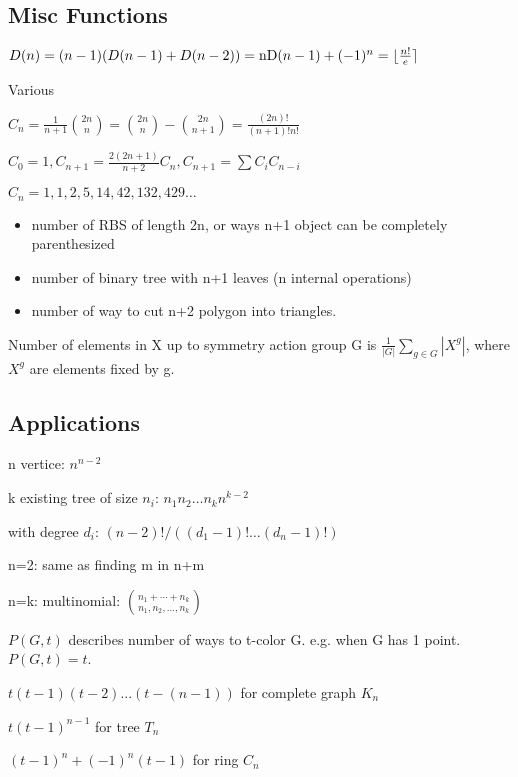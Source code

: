 \subsection{Misc Functions}

$D (n) = (n - 1) (D (n - 1) + D (n - 2)) = \operatorname{nD}
(n - 1) + (- 1)^n = \lfloor \frac{n!}{e} \rceil$

Various
\begin{tmindent}
  $C_n = \frac{1}{n + 1} \binom{2 n}{n} = \binom{2 n}{n} - \binom{2 n}{n + 1}
  = \frac{(2 n) !}{(n + 1) !n!}$
  
  $C_0 = 1, C_{n + 1} = \frac{2 (2 n + 1)}{n + 2} C_n, C_{n + 1} = \sum C_i
  C_{n - i}$
  
  $C_n = 1, 1, 2, 5, 14, 42, 132, 429 \ldots$
  
  \begin{itemize}
    \item number of RBS of length 2n, or ways n+1 object can be completely
    parenthesized
    
    \item number of  binary tree with n+1 leaves (n internal
    operations)
    
    \item number of way to cut n+2 polygon into triangles.
  \end{itemize}
\end{tmindent}
 Number of elements in X up to symmetry action
group G is $\frac{1}{| G |} \sum_{g \in G} | X^g |$, where $X^g$ are elements
fixed by g.

\subsection{Applications}

\begin{tmindent}
  n vertice: $n^{n - 2}$
  
  k existing tree of size $n_i$: $n_1 n_2 \ldots n_k n^{k - 2}$
  
  with degree $d_i$: $(n - 2) ! / ((d_1 - 1) ! \ldots (d_n - 1) !)$
\end{tmindent}
\begin{tmindent}
  n=2: same as finding m in n+m
  
  n=k: multinomial: $\binom{n_1 + \cdots + n_k}{n_1, n_2, \ldots, n_k}$
\end{tmindent}

\begin{tmindent}
  $P(G, t)$ describes number of ways to t-color G. e.g. when G has 1 point. $P(G, t) = t$.

  $t(t-1)(t-2)...(t-(n-1))$ for complete graph $K_n$

  $t(t-1)^{n-1}$ for tree $T_n$

  $(t-1)^n+(-1)^n(t-1)$ for ring $C_n$
  
\end{tmindent}
